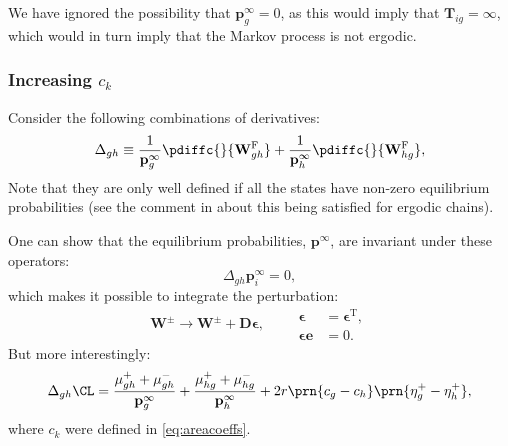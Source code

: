 \documentclass[12pt]{article}
\newcommand{\trans}{^\mathrm{T}}
\newcommand{\onev}{\mathbf{e}}
\newcommand{\eq}{\mathbf{p}^\infty}
\newcommand{\fpt}{\mathbf{T}}
\newcommand{\D}{\mathbf{D}}
\newcommand{\W}{\mathbf{W}}
\newcommand{\enc}{\mathbf{q}}
\newcommand{\frg}{\W^{\mathrm{F}}}
\begin{document}
We have ignored the possibility that $\eq_g=0$, as this would imply that $\fpt_{ig}=\infty$, which would in turn imply that the Markov process is not ergodic.


\subsubsection{Increasing \texorpdfstring{$c_k$}{c(k)}}\label{sec:areacoeffincr}

Consider the following combinations of derivatives:
%
\begin{align}
\label{eq:areacoeffincrderiv}
    \Delta_{gh} &\equiv
      \frac{1}{\eq_{g}} \pdiffc{}{\frg_{gh}}
      + \frac{1}{\eq_h} \pdiffc{}{\frg_{hg}}, \\
\end{align}
%
Note that they are only well defined if all the states have non-zero equilibrium probabilities (see the comment in  about this being satisfied for ergodic chains).

One can show that the equilibrium probabilities, $\eq$, are invariant under these operators:
%
\begin{equation}\label{eq:sareacoeffincrprob}
  \Delta_{gh} \eq_i = 0,
\end{equation}
%
which makes it possible to integrate the perturbation:
%
\begin{equation}\label{eq:areacoeffincrfinite}
  \W^\pm \to \W^\pm + \D\boldsymbol{\epsilon},
  \qquad
  \begin{aligned}
  \boldsymbol{\epsilon} &= \boldsymbol{\epsilon}\trans,
  \\
  \boldsymbol{\epsilon} \onev &= 0.
  \end{aligned}
\end{equation}
%
But more interestingly:
%
\begin{align}
\label{eq:areacoeffincr}
    \Delta_{gh}\CL &=
      \frac{\mu^+_{gh}+\mu^-_{gh}}{\eq_g} + \frac{\mu^+_{hg}+\mu^-_{hg}}{\eq_h}
      + 2r\prn{c_g-c_h}\prn{\eta^+_{g} - \eta^+_{h}},\\
\end{align}
%
where $c_k$ were defined in \eqref{eq:areacoeffs}.
\end{document}
